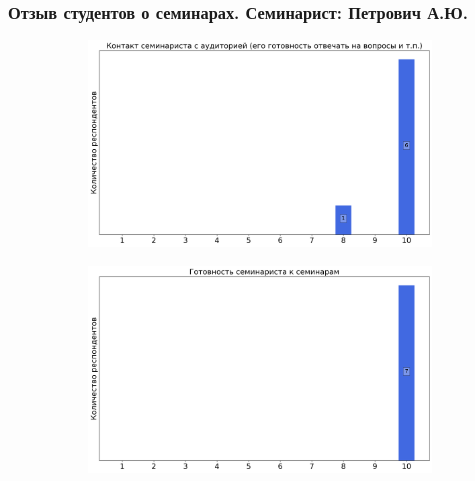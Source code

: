             
    \subsubsection{Отзыв студентов о семинарах. Семинарист: Петрович А.Ю.}
		\begin{figure}[H]
			\centering
			\begin{subfigure}[b]{0.45\textwidth}
				\centering
				\includegraphics[width=\textwidth]{images/2 course/Кратные интегралы и теория поля/seminarists-marks-Петрович А.Ю.-0.png}
			\end{subfigure}
			\begin{subfigure}[b]{0.45\textwidth}
				\centering
				\includegraphics[width=\textwidth]{images/2 course/Кратные интегралы и теория поля/seminarists-marks-Петрович А.Ю.-1.png}
			\end{subfigure}
			\begin{subfigure}[b]{0.45\textwidth}
				\centering

\end{subfigure}
\end{figure}
